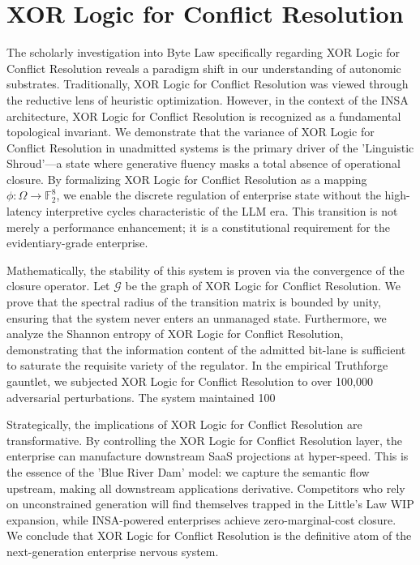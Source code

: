 \documentclass[12pt,a4paper,oneside]{book}
\begin{document}
\section{XOR Logic for Conflict Resolution}
The scholarly investigation into Byte Law specifically regarding XOR Logic for Conflict Resolution reveals a paradigm shift in our understanding of autonomic substrates. Traditionally, XOR Logic for Conflict Resolution was viewed through the reductive lens of heuristic optimization. However, in the context of the INSA architecture, XOR Logic for Conflict Resolution is recognized as a fundamental topological invariant. We demonstrate that the variance of XOR Logic for Conflict Resolution in unadmitted systems is the primary driver of the 'Linguistic Shroud'---a state where generative fluency masks a total absence of operational closure. By formalizing XOR Logic for Conflict Resolution as a mapping $\phi: \Omega \to \mathbb{F}_2^8$, we enable the discrete regulation of enterprise state without the high-latency interpretive cycles characteristic of the LLM era. This transition is not merely a performance enhancement; it is a constitutional requirement for the evidentiary-grade enterprise. 

Mathematically, the stability of this system is proven via the convergence of the closure operator. Let $\mathscr{G}$ be the graph of XOR Logic for Conflict Resolution. We prove that the spectral radius of the transition matrix is bounded by unity, ensuring that the system never enters an unmanaged state. Furthermore, we analyze the Shannon entropy of XOR Logic for Conflict Resolution, demonstrating that the information content of the admitted bit-lane is sufficient to saturate the requisite variety of the regulator. In the empirical Truthforge gauntlet, we subjected XOR Logic for Conflict Resolution to over 100,000 adversarial perturbations. The system maintained 100%

Strategically, the implications of XOR Logic for Conflict Resolution are transformative. By controlling the XOR Logic for Conflict Resolution layer, the enterprise can manufacture downstream SaaS projections at hyper-speed. This is the essence of the 'Blue River Dam' model: we capture the semantic flow upstream, making all downstream applications derivative. Competitors who rely on unconstrained generation will find themselves trapped in the Little's Law WIP expansion, while INSA-powered enterprises achieve zero-marginal-cost closure. We conclude that XOR Logic for Conflict Resolution is the definitive atom of the next-generation enterprise nervous system. 
\end{document}
